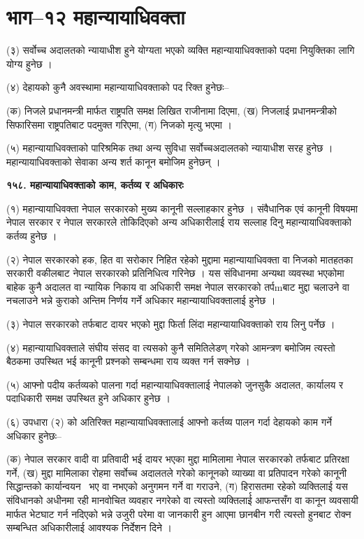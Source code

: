 \section{भाग–१२ महान्यायाधिवक्ता}

(३) सर्वोच्च अदालतको न्यायाधीश हुने योग्यता भएको व्यक्ति महान्यायाधिवक्ताको पदमा नियुक्तिका लागि योग्य हुनेछ ।

(४) देहायको कुनै अवस्थामा महान्यायाधिवक्ताको पद रिक्त हुनेछः–

(क) निजले प्रधानमन्त्री मार्फत राष्ट्रपति समक्ष लिखित राजीनामा दिएमा,
(ख) निजलाई प्रधानमन्त्रीको सिफारिसमा राष्ट्रपतिबाट पदमुक्त गरिएमा,
(ग) निजको मृत्यु भएमा ।

(५) महान्यायाधिवक्ताको पारिश्रमिक तथा अन्य सुविधा सर्वोच्चअदालतको न्यायाधीश सरह हुनेछ । महान्यायाधिवक्ताको सेवाका अन्य शर्त कानून बमोजिम हुनेछन् ।

\textbf{१५८. महान्यायाधिवक्ताको काम, कर्तव्य र अधिकारः}

(१) महान्यायाधिवक्ता नेपाल सरकारको मुख्य कानूनी सल्लाहकार हुनेछ । संवैधानिक एवं कानूनी विषयमा नेपाल सरकार र नेपाल सरकारले तोकिदिएको अन्य अधिकारीलाई राय सल्लाह दिनु महान्यायाधिवक्ताको कर्तव्य हुनेछ ।

(२) नेपाल सरकारको हक, हित वा सरोकार निहित रहेको मुद्दामा महान्यायाधिवक्ता वा निजको मातहतका सरकारी वकीलबाट नेपाल
सरकारको प्रतिनिधित्व गरिनेछ । यस संविधानमा अन्यथा व्यवस्था भएकोमा बाहेक कुनै अदालत वा न्यायिक निकाय वा अधिकारी समक्ष नेपाल सरकारको तर्पmबाट मुद्दा चलाउने वा नचलाउने भन्ने कुराको अन्तिम निर्णय गर्ने अधिकार महान्यायाधिवक्तालाई हुनेछ ।

(३) नेपाल सरकारको तर्फबाट दायर भएको मुद्दा फिर्ता लिंदा महान्यायाधिवक्ताको राय लिनु पर्नेछ ।

(४) महान्यायाधिवक्ताले संघीय संसद वा त्यसको कुनै समितिलेडण् गरेको आमन्त्रण बमोजिम त्यस्तो बैठकमा उपस्थित भई कानूनी प्रश्नको सम्बन्धमा राय व्यक्त गर्न सक्नेछ ।

(५) आफ्नो पदीय कर्तव्यको पालना गर्दा महान्यायाधिवक्तालाई नेपालको जुनसुकै अदालत, कार्यालय र पदाधिकारी समक्ष उपस्थित हुने
अधिकार हुनेछ ।

(६) उपधारा (२) को अतिरिक्त महान्यायाधिवक्तालाई आफ्नो कर्तव्य पालन गर्दा देहायको काम गर्ने अधिकार हुनेछः–

(क) नेपाल सरकार वादी वा प्रतिवादी भई दायर भएका मुद्दा मामिलामा नेपाल सरकारको तर्फबाट प्रतिरक्षा गर्ने,
(ख) मुद्दा मामिलाका रोहमा सर्वोच्च अदालतले गरेको कानूनको व्याख्या वा प्रतिपादन गरेको कानूनी सिद्धान्तको कार्यान्वयन  भए वा नभएको अनुगमन गर्ने वा गराउने,
(ग) हिरासतमा रहेको व्यक्तिलाई यस संविधानको अधीनमा रही मानवोचित व्यवहार नगरेको वा त्यस्तो व्यक्तिलार्ई आफन्तसँग वा कानून व्यवसायी मार्फत भेटघाट गर्न नदिएको भन्ने उजुरी परेमा वा जानकारी हुन आएमा छानबीन गरी त्यस्तो हुनबाट रोक्न सम्बन्धित अधिकारीलाई आवश्यक निर्देशन दिने ।

